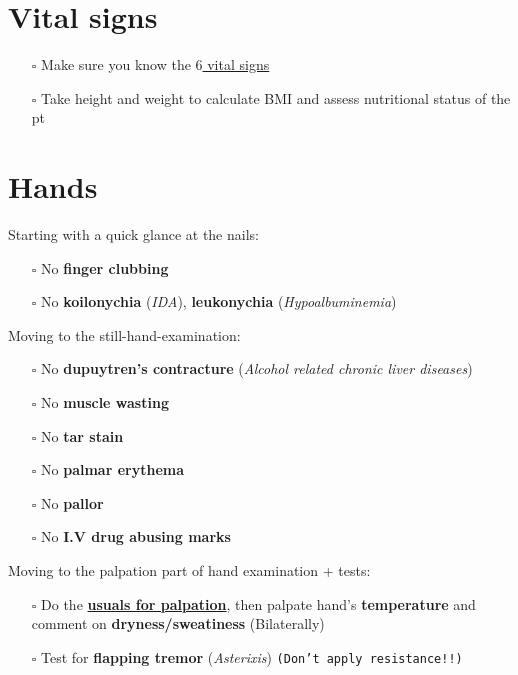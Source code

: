 \documentclass[
  13.5pt,
  a4paper,
  DIV=11,
  numbers=noendperiod]{scrreprt}
\providecommand{\tightlist}{%
  \setlength{\itemsep}{0pt}\setlength{\parskip}{0pt}}
\begin{document}
\section{Vital signs}\label{vital-signs-2}

\begin{itemize}
\tightlist
\item[$\square$]
  Make sure you know the \href{miscellaneous.qmd}{\(6\) vital signs}
\item[$\square$]
  Take height and weight to calculate BMI and assess nutritional status
  of the pt
\end{itemize}

\section{Hands}\label{hands}

Starting with a quick glance at the nails:

\begin{itemize}
\tightlist
\item[$\square$]
  No \textbf{finger clubbing}
\item[$\square$]
  No \textbf{koilonychia} (\emph{IDA}), \textbf{leukonychia}
  (\emph{Hypoalbuminemia})
\end{itemize}

Moving to the still-hand-examination:

\begin{itemize}
\tightlist
\item[$\square$]
  No \textbf{dupuytren's contracture} (\emph{Alcohol related chronic
  liver diseases})
\item[$\square$]
  No \textbf{muscle wasting}
\item[$\square$]
  No \textbf{tar stain}
\item[$\square$]
  No \textbf{palmar erythema}
\item[$\square$]
  No \textbf{pallor}
\item[$\square$]
  No \textbf{I.V drug abusing marks}
\end{itemize}

Moving to the palpation part of hand examination + tests:

\begin{itemize}
\tightlist
\item[$\square$]
  Do the \textbf{\href{miscellaneous.qmd}{usuals for palpation}}, then
  palpate hand's \textbf{temperature} and comment on
  \textbf{dryness/sweatiness} (Bilaterally)
\item[$\square$]
  Test for \textbf{flapping tremor} (\emph{Asterixis})
  \texttt{(Don’t\ apply\ resistance!!)}
\end{itemize}
\end{document}
